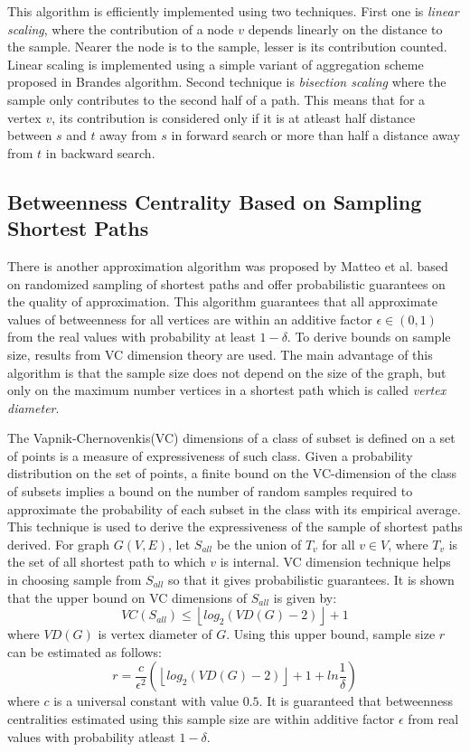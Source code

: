 \documentclass[runningheads,a4paper]{llncs}
\begin{document}
This algorithm is efficiently implemented using two techniques. First one is \textit{linear scaling}, where the contribution of a node $v$ depends linearly on the distance to the sample. Nearer the node is to the sample, lesser is its contribution counted. Linear scaling is implemented using a simple variant of aggregation scheme proposed in Brandes algorithm. Second technique is \textit{bisection scaling} where the sample only contributes to the second half of a path. This means that for a vertex $v$, its contribution is considered only if it is at atleast half distance between $s$ and $t$ away from $s$ in forward search or more than half a distance away from $t$ in backward search. 


\subsection*{Betweenness Centrality Based on Sampling Shortest Paths}
There  is another approximation algorithm was proposed by Matteo et al. \cite{matteo} based on randomized sampling of shortest paths and offer probabilistic guarantees on the quality of approximation. This algorithm guarantees that all approximate values of betweenness for all vertices are within an additive factor $\epsilon \in (0,1)$ from the real values with probability at least $1-\delta$. To derive bounds on sample size, results from VC dimension theory\cite{vc} are used. The main advantage of this algorithm is that the sample size does not depend on the size of the graph, but only on the maximum number vertices in a shortest path which is called \textit{vertex diameter}.  

The Vapnik-Chernovenkis(VC) dimensions of a class of subset is defined on a set of points is a measure of expressiveness of such class. Given a probability distribution on the set of points, a finite bound on the VC-dimension of the class of subsets implies a bound on the number of random samples required to approximate the probability of each subset in the class with its empirical average. This technique is used to derive the expressiveness of the sample of shortest paths derived. For graph $G(V,E)$, let $S_{all}$ be the union of $T_{v}$ for all $v \in V$, where $T_{v}$ is the set of all shortest path to which $v$ is internal. VC dimension technique helps in choosing sample from $S_{all}$ so that it gives probabilistic guarantees. It is shown that the upper bound on VC dimensions of $S_{all}$ is given by:
$$VC(S_{all}) \leq \left\lfloor{log_{2}(VD(G) - 2)}\right\rfloor + 1$$
where $VD(G)$ is vertex diameter of $G$. Using this upper bound, sample size $r$ can be estimated as follows:
\begin{equation} \label{sample_size_algo}
r = \frac{c}{\epsilon^{2}}(\left\lfloor{log_{2}(VD(G) - 2)}\right\rfloor + 1 + ln\frac{1}{\delta})
\end{equation} 
where $c$ is a universal constant with value $0.5$. It is guaranteed that betweenness centralities estimated using this sample size are within additive factor $\epsilon$ from real values with probability atleast $1-\delta$. 
\end{document}
